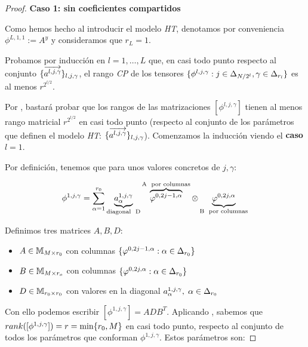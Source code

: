 \begin{proof}
    \textbf{Caso 1: sin coeficientes compartidos}

    Como hemos hecho al introducir el modelo \textit{HT}, denotamos por conveniencia $\phi^{L, 1, 1}:= A^y$ y consideramos que $r_L = 1$.

    Probamos por inducción en $l = 1, \ldots, L$ que, en casi todo punto respecto al conjunto $\{ \overrightarrow{a^{l, j, \gamma}} \}_{l, j, \gamma}$, el rango \textit{CP} de los tensores $\{ \phi^{l, j, \gamma}: j \in \Delta_{N/2^l}, \gamma \in \Delta_{r_l} \}$ es al menos $r^{2^{l/2}}$.

    Por , bastará probar que los rangos de las matrizaciones $[\phi^{l, j, \gamma}]$ tienen al menos rango matricial $r^{2^{l/2}}$ en casi todo punto (respecto al conjunto de los parámetros que definen el modelo \textit{HT}: $\{  \overrightarrow{a^{l, j, \gamma}} \}_{l, j, \gamma}$). Comenzamos la inducción viendo el \textbf{caso $l = 1$}.

    Por definición, tenemos que para unos valores concretos de $j, \gamma$:

    \begin{equation}
        \phi^{1, j, \gamma} = \sum_{\alpha = 1}^{r_0} \underbrace{a_{\alpha}^{1, j, \gamma}}_\textrm{\text{diagonal } D} \overbrace{\varphi^{0, 2j - 1, \alpha}}^\textrm{A \text{ por columnas}} \otimes \underbrace{\varphi^{0, 2j, \alpha}}_\textrm{B \text{ por columnas}}
    \end{equation}

    Definimos tres matrices $A, B, D$:

    \begin{itemize}
        \item $A \in \mathbb{M}_{M \times r_0}$ con columnas $\{ \varphi^{0, 2j - 1, \alpha}: \alpha \in \Delta_{r_0} \}$
        \item $B \in \mathbb{M}_{M \times r_o}$ con columnas $\{ \varphi^{0, 2j, \alpha}: \alpha \in \Delta_{r_0} \}$
        \item $D \in \mathbb{M}_{r_0 \times r_0}$ con valores en la diagonal $a_{\alpha}^{1, j, \gamma}, \; \alpha \in \Delta_{r_0}$
    \end{itemize}

    Con ello podemos escribir $[\phi^{1, j, \gamma}] = A D B^T$. Aplicando , sabemos que $rank([\phi^{1, j, \gamma}]) = r = \min \{ r_0, M \}$ en casi todo punto, respecto al conjunto de todos los parámetros que conforman $\phi^{1, j, \gamma}$. Estos parámetros son:


\end{proof}
